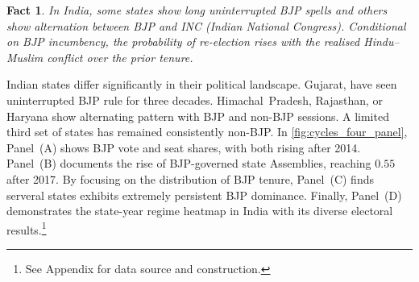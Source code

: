 \documentclass[11pt,twoside]{extarticle}
\newtheorem{fact}{Fact}
\newcommand{\suppmat}{\textcolor{blue}{Supplementary Materials}}
\begin{document}

\begin{fact}\label{fact:2}
In India, some states show long uninterrupted BJP spells and others show alternation between BJP and INC (Indian National Congress). Conditional on BJP incumbency, the probability of re-election rises with the realised Hindu--Muslim conflict over the prior tenure.
 
\end{fact}

Indian states differ significantly in their political landscape. Gujarat, have seen uninterrupted BJP rule for three decades. Himachal~Pradesh, Rajasthan, or Haryana show alternating pattern with BJP and non-BJP sessions. A limited third set of states has remained consistently non-BJP. In \autoref{fig:cycles_four_panel}, Panel~(A) shows BJP vote and seat shares, with both rising after 2014. Panel~(B) documents the rise of BJP-governed state Assemblies, reaching $0.55$ after 2017. By focusing on the distribution of BJP tenure, Panel~(C) finds serveral states exhibits extremely persistent BJP dominance. Finally, Panel~(D) demonstrates the state-year regime heatmap in India with its diverse electoral results.\footnote{See Appendix for data source and construction.} 
\end{document}
